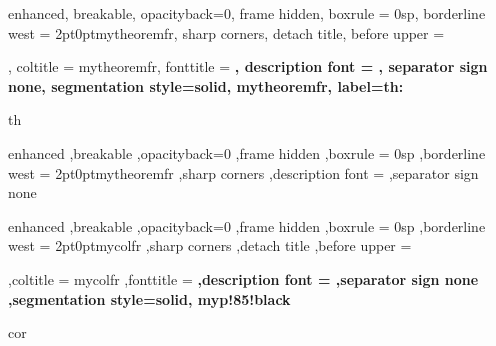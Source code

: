 \usepackage{pifont}
\usepackage{pdfpages}
\usepackage{ifpdf}\ifpdf\usepackage{transparent}\fi
\renewcommand{\proofname}{\textbf{Proof}}
\newcommand\mycommfont[1]{\footnotesize\ttfamily\textcolor{blue}{#1}}
\usepackage{tikzsymbols}
\usepackage{fontawesome5}
\renewcommand\qedsymbol{\faDiceD20}%
\titlespacing{\chapter}{0pt}{-20pt}{0pt}
{%
	enhanced,
	breakable,
	opacityback=0,
	frame hidden,
	boxrule = 0sp,
	borderline west = {2pt}{0pt}{mytheoremfr},
	sharp corners,
	detach title,
	before upper = \tcbtitle\par\smallskip,
	coltitle = mytheoremfr,
	fonttitle = \bfseries\sffamily,
	description font = \mdseries,
	separator sign none,
	segmentation style={solid, mytheoremfr},
    label={th:\thetcbcounter}
}
{th}

{%
	enhanced
	,breakable
	,opacityback=0
	,frame hidden
	,boxrule = 0sp
	,borderline west = {2pt}{0pt}{mytheoremfr}
	,sharp corners
	,description font = \mdseries
	,separator sign none
}
{%
	enhanced
	,breakable
	,opacityback=0
	,frame hidden
	,boxrule = 0sp
	,borderline west = {2pt}{0pt}{mycolfr}
	,sharp corners
	,detach title
	,before upper = \tcbtitle\par\smallskip
	,coltitle = mycolfr
	,fonttitle = \bfseries\sffamily
	,description font = \mdseries
	,separator sign none
	,segmentation style={solid, myp!85!black}
}{cor}

